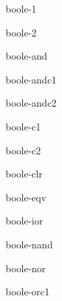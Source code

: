 \documentclass[10pt,english]{book}
\begin{document}
\begin{constant}{boole-1}{}
  
\end{constant}

\begin{constant}{boole-2}{}
  
\end{constant}

\begin{constant}{boole-and}{}
  
\end{constant}

\begin{constant}{boole-andc1}{}
  
\end{constant}

\begin{constant}{boole-andc2}{}
  
\end{constant}

\begin{constant}{boole-c1}{}
  
\end{constant}

\begin{constant}{boole-c2}{}
  
\end{constant}

\begin{constant}{boole-clr}{}
  
\end{constant}

\begin{constant}{boole-eqv}{}
  
\end{constant}

\begin{constant}{boole-ior}{}
  
\end{constant}

\begin{constant}{boole-nand}{}
  
\end{constant}

\begin{constant}{boole-nor}{}
  
\end{constant}

\begin{constant}{boole-orc1}{}
  
\end{constant}
\end{document}
